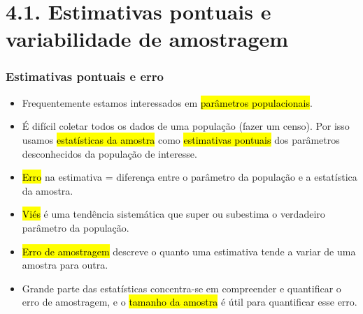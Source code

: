 
\section{4.1. Estimativas pontuais e variabilidade de amostragem}


\begin{frame}
\frametitle{Estimativas pontuais e erro}
\justifying

\begin{itemize}
    \justifying
    \footnotesize
    \item Frequentemente estamos interessados em \hl{parâmetros populacionais}.
    \item É difícil coletar todos os dados de uma população (fazer um censo). Por isso usamos \hl{estatísticas da amostra} como \hl{estimativas pontuais} dos parâmetros desconhecidos da população de interesse.
    \item \hl{Erro} na estimativa = diferença entre o parâmetro da população e a estatística da amostra.
    \item \hl{Viés} é uma tendência sistemática que super ou subestima o verdadeiro parâmetro da população.
    \item \hl{Erro de amostragem} descreve o quanto uma estimativa tende a variar de uma amostra para outra.
    \item Grande parte das estatísticas concentra-se em compreender e quantificar o erro de amostragem, e o \hl{tamanho da amostra} é útil para quantificar esse erro.
\end{itemize}

\end{frame}

\begin{frame}
\justifying
{}

\pause
\justifying
{}

\end{frame}


